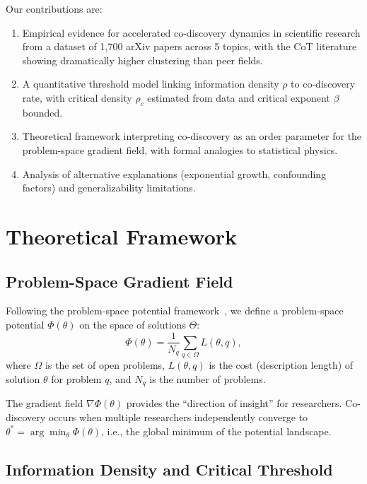 \documentclass[12pt]{article}
\begin{document}
Our contributions are:
\begin{enumerate}
    \item Empirical evidence for accelerated co-discovery dynamics in scientific research from a dataset of 1,700 arXiv papers across 5 topics, with the CoT literature showing dramatically higher clustering than peer fields.
    \item A quantitative threshold model linking information density $\rho$ to co-discovery rate, with critical density $\rho_c$ estimated from data and critical exponent $\beta$ bounded.
    \item Theoretical framework interpreting co-discovery as an order parameter for the problem-space gradient field, with formal analogies to statistical physics.
    \item Analysis of alternative explanations (exponential growth, confounding factors) and generalizability limitations.
\end{enumerate}

\section{Theoretical Framework}

\subsection{Problem-Space Gradient Field}

Following the problem-space potential framework~\cite{goldfeld-2024, sornette-2006}, we define a problem-space potential $\Phi(\theta)$ on the space of solutions $\Theta$:
\begin{equation}
  \Phi(\theta) = \frac{1}{N_q} \sum_{q \in \Omega} L(\theta, q),
\end{equation}
where $\Omega$ is the set of open problems, $L(\theta, q)$ is the cost (description length) of solution $\theta$ for problem $q$, and $N_q$ is the number of problems.

The gradient field $\nabla \Phi(\theta)$ provides the ``direction of insight'' for researchers. Co-discovery occurs when multiple researchers independently converge to $\theta^* = \arg\min_\theta \Phi(\theta)$, i.e., the global minimum of the potential landscape.

\subsection{Information Density and Critical Threshold}
\end{document}
